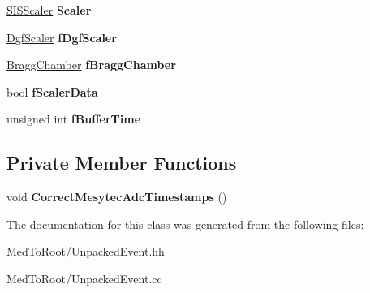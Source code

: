 \begin{DoxyCompactItemize}
\item 
\hypertarget{class_unpacked_event_a88d4f6879caf81bed72049adb9f88802}{\hyperlink{class_s_i_s_scaler}{S\-I\-S\-Scaler} {\bfseries Scaler}}\label{class_unpacked_event_a88d4f6879caf81bed72049adb9f88802}

\item 
\hypertarget{class_unpacked_event_ad0a12f7dec89cf5cad8f7df4c2fe5013}{\hyperlink{class_dgf_scaler}{Dgf\-Scaler} {\bfseries f\-Dgf\-Scaler}}\label{class_unpacked_event_ad0a12f7dec89cf5cad8f7df4c2fe5013}

\item 
\hypertarget{class_unpacked_event_ac705f3a8de8500aeb6f7cb3951b76d0e}{\hyperlink{class_bragg_chamber}{Bragg\-Chamber} {\bfseries f\-Bragg\-Chamber}}\label{class_unpacked_event_ac705f3a8de8500aeb6f7cb3951b76d0e}

\item 
\hypertarget{class_unpacked_event_a13011a375b40157797fbd84e4a4fd092}{bool {\bfseries f\-Scaler\-Data}}\label{class_unpacked_event_a13011a375b40157797fbd84e4a4fd092}

\item 
\hypertarget{class_unpacked_event_a46e5d49e6b7fb87cf00e4feb03c2b875}{unsigned int {\bfseries f\-Buffer\-Time}}\label{class_unpacked_event_a46e5d49e6b7fb87cf00e4feb03c2b875}

\end{DoxyCompactItemize}
\subsection*{Private Member Functions}
\begin{DoxyCompactItemize}
\item 
\hypertarget{class_unpacked_event_af6a5c2addbb7e825c9c850e2d7a06c06}{void {\bfseries Correct\-Mesytec\-Adc\-Timestamps} ()}\label{class_unpacked_event_af6a5c2addbb7e825c9c850e2d7a06c06}

\end{DoxyCompactItemize}


The documentation for this class was generated from the following files\-:\begin{DoxyCompactItemize}
\item 
Med\-To\-Root/Unpacked\-Event.\-hh\item 
Med\-To\-Root/Unpacked\-Event.\-cc\end{DoxyCompactItemize}
